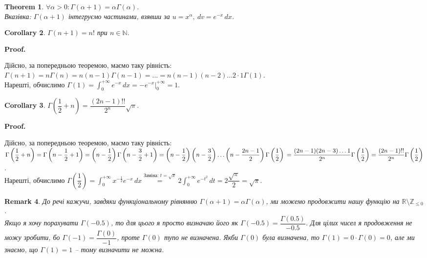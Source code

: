 \documentclass[a4paper, 10pt]{article}
\makeatletter
\def\huge{\displaystyle}
\def\qed{$\blacksquare$}
\theoremstyle{theoremdd}
\newtheorem{theorem}{Theorem}[subsection]
\theoremstyle{theoremdd}
\theoremstyle{theoremdd}
\theoremstyle{theoremdd}
\theoremstyle{theoremdd}
\theoremstyle{theoremdd}
\theoremstyle{theoremdd}
\newtheorem{remark}[theorem]{Remark}
\theoremstyle{theoremdd}
\theoremstyle{theoremdd}
\newtheorem{corollary}[theorem]{Corollary}
\renewenvironment{proof}[1][Proof.\\]{\par
\pushQED{\hfill \qed}%
\normalfont \topsep6\p@\@plus6\p@\relax
\trivlist
\item\relax
{\bfseries
#1\@addpunct{.}}\hspace\labelsep\ignorespaces
}{%
\popQED\endtrivlist\@endpefalse
}
\makeatother
\begin{document}
\begin{theorem}
$\forall \alpha > 0: \Gamma (\alpha+1) = \alpha \Gamma (\alpha)$.\\
\textit{Вказівка: $\Gamma(\alpha+1)$ інтегруємо частинами, взявши за} $u = x^{\alpha},\ dv = e^{-x}\,dx$.
\end{theorem}

\begin{corollary}
$\Gamma(n+1) = n!$ при $n \in \mathbb{N}$.
\end{corollary}

\begin{proof}
Дійсно, за попередньою теоремою, маємо таку рівність:\\
$\Gamma(n+1) = n \Gamma (n) = n(n-1) \Gamma (n-1) = \dots = n(n-1)(n-2)\dots 2 \cdot 1 \Gamma (1)$.\\
Нарешті, обчислимо $\Gamma(1) = \huge \int_0^{+\infty} e^{-x}\,dx = -e^{-x} \Big|_{0}^{+\infty} = 1$.
\end{proof}

\begin{corollary}
$\Gamma \left( \dfrac{1}{2} + n \right) = \dfrac{(2n-1)!!}{2^n} \sqrt{\pi}$.
\end{corollary}

\begin{proof}
Дійсно, за попередньою теоремою, маємо таку рівність:\\
$\Gamma\left( \dfrac{1}{2}+n\right) = \Gamma\left( n - \dfrac{1}{2} + 1 \right) = \left( n - \dfrac{1}{2} \right) \Gamma\left( n - \dfrac{3}{2} + 1\right) = \left( n - \dfrac{1}{2} \right) \left( n - \dfrac{3}{2} \right) \dots \left( n - \dfrac{2n-1}{2} \right) \Gamma\left( \dfrac{1}{2} \right) \\
= \dfrac{(2n-1)(2n-3) \dots 1}{2^n} \Gamma\left( \dfrac{1}{2}\right) = \dfrac{(2n-1)!!}{2^n} \Gamma\left( \dfrac{1}{2}\right)$.\\
Нарешті, обчислимо $\Gamma \left( \dfrac{1}{2} \right) = \huge \int_0^{+\infty} x^{-\frac{1}{2}}e^{-x}\,dx \overset{\textrm{Заміна: } t = \sqrt{x}}{=} 2 \huge \int_0^{+\infty} e^{-t^2}\,dt = 2 \dfrac{\sqrt{\pi}}{2} = \sqrt{\pi}$.
\end{proof}

\begin{remark}
До речі кажучи, завдяки функціональному рівнянню $\Gamma(\alpha+1) = \alpha \Gamma(\alpha)$, ми можемо продовжити нашу функцію на $\mathbb{R} \setminus \mathbb{Z}_{\leq 0}$.\\
Якщо я хочу порахувати $\Gamma(-0.5)$, то для цього я просто визначаю його як $\Gamma(-0.5) = \dfrac{\Gamma(0.5)}{-0.5}$. Для цілих чисел я продовження не можу зробити, бо $\Gamma(-1) = \dfrac{\Gamma(0)}{-1}$, проте $\Gamma(0)$ тупо не визначена. Якби $\Gamma(0)$ була визначена, то $\Gamma(1) = 0 \cdot \Gamma(0) = 0$, але ми знаємо, що $\Gamma(1) =1$ -- тому визначити не можна.
\end{remark}
\end{document}
